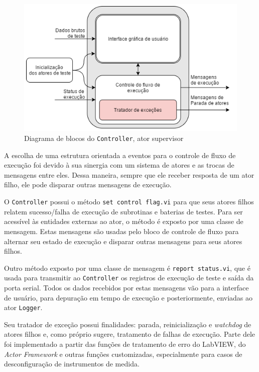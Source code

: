             \begin{figure}
                \centering
                \includegraphics[width=0.9\linewidth]{fig/diag/diagctrl.png}
                \caption{Diagrama de blocos do \texttt{Controller}, ator supervisor}
                \label{fig:diagctrl}
            \end{figure}
            
            A escolha de uma estrutura orientada a eventos para o controle de fluxo de execução foi devido à sua sinergia com um sistema de atores e as trocas de mensagens entre eles. Dessa maneira, sempre que ele receber resposta de um ator filho, ele pode disparar outras mensagens de execução.
    
            O \texttt{Controller} possui o método \texttt{set control flag.vi} para que seus atores filhos relatem sucesso/falha de execução de subrotinas e baterias de testes. Para ser acessível às entidades externas ao ator, o método é exposto por uma classe de mensagem. Estas mensagens são usadas pelo bloco de controle de fluxo para alternar seu estado de execução e disparar outras mensagens para seus atores filhos.
            
            Outro método exposto por uma classe de mensagem é \texttt{report status.vi}, que é usada para transmitir ao \texttt{Controller} os registros de execução de teste e saída da porta serial. Todos os dados recebidos por estas mensagens vão para a interface de usuário, para depuração em tempo de execução e posteriormente, enviadas ao ator \texttt{Logger}.
            
            Seu tratador de exceção possui finalidades: parada, reinicialização e \textit{watchdog} de atores filhos e, como próprio sugere, tratamento de falhas de execução. Parte dele foi implementado a partir das funções de tratamento de erro do LabVIEW, do \textit{Actor Framework} e outras funções customizadas, especialmente para casos de desconfiguração de instrumentos de medida.
            

